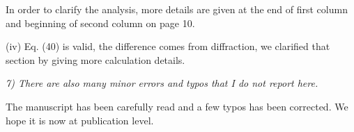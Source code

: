 \documentclass{article}
\begin{document}
In order to clarify the analysis, more details are given at the end of first column and beginning of second column on  page 10.

(iv) Eq. (40) is valid, the difference comes from diffraction, we clarified that section by giving more calculation details.

\textit{
7) There are also many minor errors and typos that I do not report here.
}

The manuscript has been carefully read and a few typos has been corrected. We hope it is now at publication level.
\end{document}
